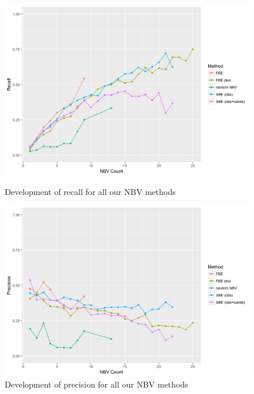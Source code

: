 \documentclass[a4paper,11pt,english]{article}
\begin{document}
\begin{figure}[h!]
	\begin{center}
		\includegraphics[width=0.98\textwidth]{src/Plots/recall_vs_nbv_count_scattered.png}
		\caption{Development of recall for all our NBV methods}
		\label{fig:recall_vs_nbv_count}
	\end{center}

	\begin{center}
		\includegraphics[width=0.98\textwidth]{src/Plots/precision_vs_nbv_count_scattered.png}
		\caption{Development of precision for all our NBV methods}
		\label{fig:precision_vs_nbv_count}
	\end{center}
\end{figure}
\end{document}
